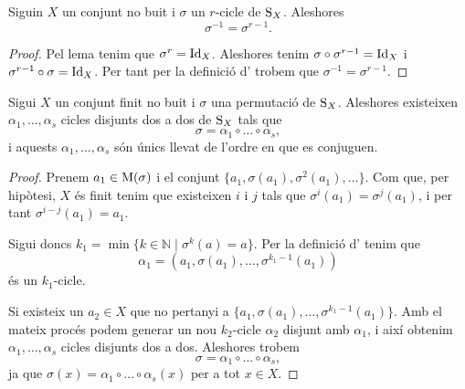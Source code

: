\documentclass[../Apunts.tex]{subfiles}
\begin{document}
	\begin{theorem}
		\label{thm:inversa d'un r-cicle}
		Siguin \(X\) un conjunt no buit i \(\sigma\) un \(r\)-cicle de \(\operatorname{S}_{X}\). Aleshores
		\[\sigma^{-1}=\sigma^{r-1}.\]
		\begin{proof}
			Pel lema  tenim que \(\sigma^{r}=\operatorname{Id}_{X}\). Aleshores tenim \(\sigma\circ\sigma^{r-1}=\operatorname{Id}_{X}\) i \(\sigma^{r-1}\circ\sigma=\operatorname{Id}_{X}\). Per tant per la definició d' trobem que \(\sigma^{-1}=\sigma^{r-1}\).
		\end{proof}
	\end{theorem}
	\begin{theorem}
		\label{thm:descomposició d'una permutació en cicles disjunts}
		Sigui \(X\) un conjunt finit no buit i \(\sigma\) una permutació de \(\operatorname{S}_{X}\). Aleshores existeixen \(\alpha_{1},\dots,\alpha_{s}\) cicles disjunts dos a dos de \(\operatorname{S}_{X}\) tals que
		\[\sigma=\alpha_{1}\circ\dots\circ\alpha_{s},\]
		i aquests \(\alpha_{1},\dots,\alpha_{s}\) són únics llevat de l'ordre en que es conjuguen.
		\begin{proof}
			Prenem \(a_{1}\in\operatorname{M}(\sigma)\) i el conjunt \(\{a_{1},\sigma(a_{1}),\sigma^{2}(a_{1}),\dots\}\). Com que, per hipòtesi, \(X\) és finit tenim que existeixen \(i\) i \(j\) tals que \(\sigma^{i}(a_{1})=\sigma^{j}(a_{1})\), i per tant \(\sigma^{i-j}(a_{1})=a_{1}\).
			
			Sigui doncs \(k_{1}=\min\{k\in\mathbb{N}\mid\sigma^{k}(a)=a\}\). Per la definició d' tenim que 
			\begin{equation}
			\label{eq:thm:descomposició de permutacions en cicles disjunts 2}
			\alpha_{1}=(a_{1},\sigma(a_{1}),\dots,\sigma^{k_{1}-1}(a_{1}))
			\end{equation}
			és un \(k_{1}\)-cicle.
			
			Si existeix un \(a_{2}\in X\) que no pertanyi a \(\{a_{1},\sigma(a_{1}),\dots,\sigma^{k_{1}-1}(a_{1})\}\). Amb el mateix procés podem generar un nou \(k_{2}\)-cicle \(\alpha_{2}\) disjunt amb \(\alpha_{1}\), i així obtenim \(\alpha_{1},\dots,\alpha_{s}\) cicles disjunts dos a dos. Aleshores trobem
			\[\sigma=\alpha_{1}\circ\dots\circ\alpha_{s},\]
			ja que \(\sigma(x)=\alpha_{1}\circ\dots\circ\alpha_{s}(x)\) per a tot \(x\in X\).
			

\end{proof}
\end{theorem}
\end{document}
